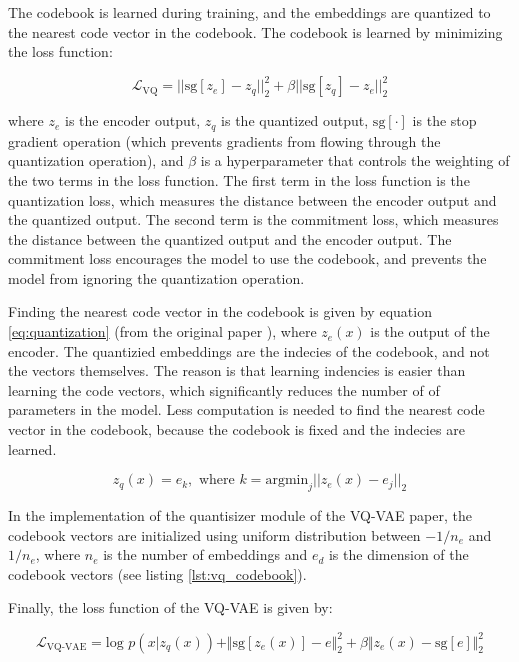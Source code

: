 The codebook is learned during training, and the embeddings are quantized to the nearest code vector in the codebook. The codebook is learned by minimizing the loss function:

\begin{equation}
    \mathcal{L}_{\text{VQ}} = || \text{sg}[z_e] - z_q ||_2^2 + \beta || \text{sg}[z_q] - z_e ||_2^2
\label{eq:vq_loss}
\end{equation}

where $z_e$ is the encoder output, $z_q$ is the quantized output, $\text{sg}[\cdot]$ is the stop gradient operation (which prevents gradients from flowing through the quantization operation), and $\beta$ is a hyperparameter that controls the weighting of the two terms in the loss function. The first term in the loss function is the quantization loss, which measures the distance between the encoder output and the quantized output. The second term is the commitment loss, which measures the distance between the quantized output and the encoder output. The commitment loss encourages the model to use the codebook, and prevents the model from ignoring the quantization operation.

Finding the nearest code vector in the codebook is given by equation \ref{eq:quantization} (from the original paper \cite{vqvae}), where $z_e(x)$ is the output of the encoder. The quantizied embeddings are the indecies of the codebook, and not the vectors themselves. The reason is that learning indencies is easier than learning the code vectors, which significantly reduces the number of of parameters in the model. Less computation is needed to find the nearest code vector in the codebook, because the codebook is fixed and the indecies are learned.

\begin{equation}
    \label{eq:quantization}
    z_q(x)=e_k, \text{  where } k = \text{argmin}_j || z_e(x) - e_j ||_2
\end{equation}

In the implementation of the quantisizer module of the VQ-VAE paper, the codebook vectors are initialized using uniform distribution between $-1/n_e$ and $1/n_e$, where $n_e$ is the number of embeddings and $e_d$ is the dimension of the codebook vectors (see listing \ref{lst:vq_codebook}).

Finally, the loss function of the VQ-VAE is given by:

\begin{equation}
    \mathcal{L}_\text{VQ-VAE} = \text{log } p(x|z_q(x)) + \Vert \text{sg}[z_e(x)] - e \Vert_2^2 + \beta \Vert z_e(x) - \text{sg}[e] \Vert_2^2
    \label{eq:vqvae_loss}
\end{equation}
    
